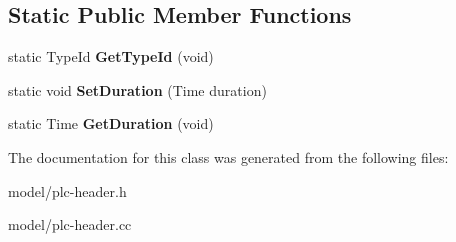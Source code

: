 \subsection*{\-Static \-Public \-Member \-Functions}
\begin{DoxyCompactItemize}
\item 
\hypertarget{classns3_1_1PLC__Preamble_ae0b0339a24edbf4067b5c0f5f2c680e7}{static \-Type\-Id {\bfseries \-Get\-Type\-Id} (void)}\label{classns3_1_1PLC__Preamble_ae0b0339a24edbf4067b5c0f5f2c680e7}

\item 
\hypertarget{classns3_1_1PLC__Preamble_ab306dc0c7f41b9d64950c8bbdfe8a2ce}{static void {\bfseries \-Set\-Duration} (\-Time duration)}\label{classns3_1_1PLC__Preamble_ab306dc0c7f41b9d64950c8bbdfe8a2ce}

\item 
\hypertarget{classns3_1_1PLC__Preamble_a7fdd5365617ef74a57d68d901a2fcd0c}{static \-Time {\bfseries \-Get\-Duration} (void)}\label{classns3_1_1PLC__Preamble_a7fdd5365617ef74a57d68d901a2fcd0c}

\end{DoxyCompactItemize}


\-The documentation for this class was generated from the following files\-:\begin{DoxyCompactItemize}
\item 
model/plc-\/header.\-h\item 
model/plc-\/header.\-cc\end{DoxyCompactItemize}
